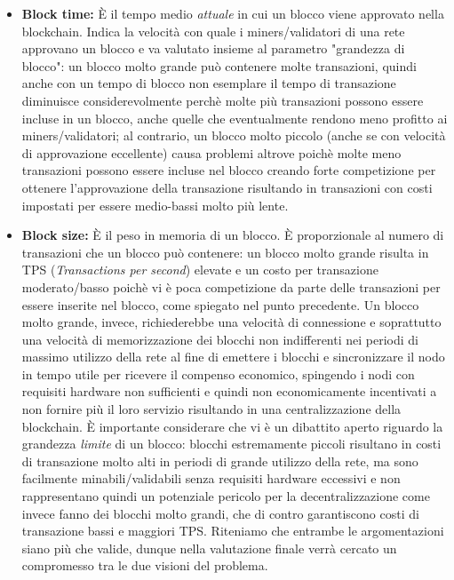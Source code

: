 \documentclass[a4paper, 12pt]{article}
\begin{document}
\begin{itemize}
\newpage

\item \textbf{Block time: }
È il tempo medio \textit{attuale} in cui un blocco viene approvato nella blockchain. Indica la velocità con quale i miners/validatori di una rete approvano un blocco e va valutato insieme al parametro "grandezza di blocco": un blocco molto grande può contenere molte transazioni, quindi anche con un tempo di blocco non esemplare il tempo di transazione diminuisce considerevolmente
perchè molte più transazioni possono essere incluse in un blocco, anche quelle che eventualmente rendono meno profitto ai miners/validatori; al contrario, un blocco molto piccolo (anche se con velocità
di approvazione eccellente) causa problemi altrove poichè molte meno transazioni possono essere incluse nel blocco creando forte competizione per ottenere l'approvazione della transazione risultando
in transazioni con costi impostati per essere medio-bassi molto più lente.\\

\item \textbf{Block size: }
È il peso in memoria di un blocco. È proporzionale al numero di transazioni che un blocco può contenere: un blocco molto grande risulta in TPS (\textit{Transactions per second}) elevate e un costo per transazione
moderato/basso poichè vi è poca competizione da parte delle transazioni per essere inserite nel blocco, come spiegato nel punto precedente. Un blocco molto grande, invece, richiederebbe una velocità di connessione e soprattutto una velocità di memorizzazione dei blocchi non indifferenti nei periodi di massimo utilizzo della rete al fine di emettere i blocchi e sincronizzare il nodo in tempo utile per ricevere il compenso economico, spingendo i nodi con requisiti hardware non sufficienti e quindi non economicamente incentivati a non fornire più il loro servizio risultando in una centralizzazione della blockchain.
È importante considerare che vi è un dibattito aperto riguardo la grandezza \textit{limite} di un blocco: blocchi estremamente piccoli risultano in costi di transazione molto alti in periodi di grande utilizzo della rete, ma sono facilmente minabili/validabili senza requisiti hardware eccessivi e non rappresentano quindi un potenziale pericolo per la decentralizzazione come invece fanno
dei blocchi molto grandi, che di contro garantiscono costi di transazione bassi e maggiori TPS. Riteniamo che entrambe le argomentazioni siano più che valide, dunque nella
valutazione finale verrà cercato un compromesso tra le due visioni del problema.\\


\end{itemize}
\end{document}
